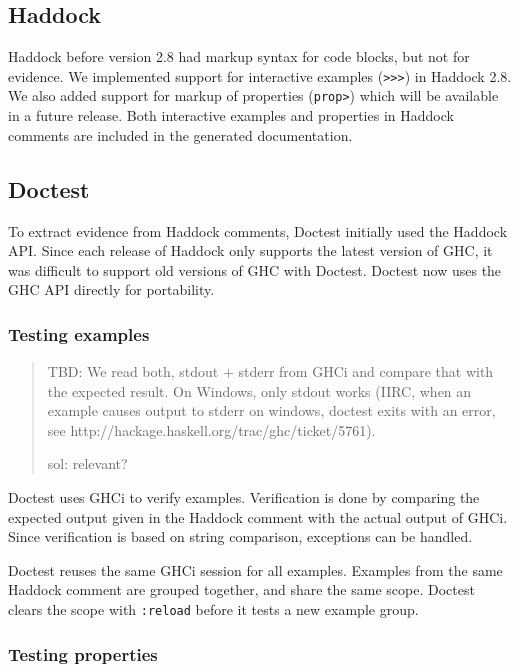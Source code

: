 \documentclass[preprint]{sigplanconf}
\begin{document}
\subsection{Haddock}
\label{sec:haddock}

Haddock before version 2.8 had markup syntax for
code blocks, but not for evidence.
We implemented support for interactive examples ({\tt >>>}) in
Haddock 2.8.
We also added support for markup of properties ({\tt prop>}) which
will be available in a future release.
Both interactive examples and properties in Haddock comments are
included in the generated documentation.

\subsection{Doctest}
\label{sec:doctest}

To extract evidence from Haddock comments,
Doctest initially used the Haddock API.
Since each release of Haddock only supports the latest version of GHC,
it was difficult to support old versions of GHC with Doctest.
Doctest now uses the GHC API directly for portability.

\subsubsection{Testing examples}

\begin{quote}
    TBD: We read both, stdout + stderr from GHCi and compare that with the
    expected result.  On Windows, only stdout works (IIRC, when an
    example causes output to stderr on windows, doctest exits with an
    error, see http://hackage.haskell.org/trac/ghc/ticket/5761).

    sol: relevant?
\end{quote}

Doctest uses GHCi to verify examples.  Verification is done by
comparing the expected output given in the Haddock comment with the
actual output of GHCi.  Since verification is based on string
comparison, exceptions can be handled.

Doctest reuses the same GHCi session for all examples.
Examples from the same Haddock comment are grouped together,
and share the same scope.
Doctest clears the scope with \verb|:reload| before it tests a new
example group.

\subsubsection{Testing properties}
\end{document}
